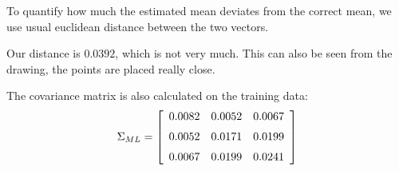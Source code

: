 To quantify how much the estimated mean deviates from the correct
mean, we use usual euclidean distance between the two vectors.

Our distance is $0.0392$, which is not very much. This can also be
seen from the drawing, the points are placed really close.

The covariance matrix is also calculated on the training data:\\
$$\Sigma _{ML} = \left[
  \begin {array}{ccc}
    0.0082 & 0.0052 & 0.0067\\
    \noalign{\medskip}
    0.0052 & 0.0171 & 0.0199\\
    \noalign{\medskip}
    0.0067 & 0.0199 & 0.0241\\
  \end {array}
  \right]$$
